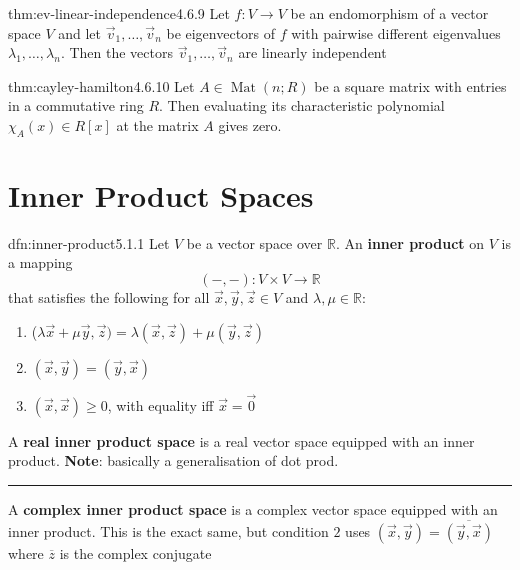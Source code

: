 \documentclass[landscape, 8pt]{extarticle}
\DeclareMathOperator{\Mat}{Mat}
\begin{document}
\begin{multicols}{3}
\vspace{-5pt}
\begin{thm}{thm:ev-linear-independence}{4.6.9}
    Let $f : V\to V$ be an endomorphism of a vector space $V$ and let $\vec{v}_{1},\dots,\vec{v}_{n}$ be eigenvectors of $f$ with pairwise different eigenvalues $\lambda_{1},\dots,\lambda_{n}$. Then the vectors $\vec{v}_{1},\dots,\vec{v}_{n}$ are linearly independent
\end{thm}

\vspace{-5pt}
\begin{thm}{thm:cayley-hamilton}{4.6.10}
    Let $A\in \Mat(n;R)$ be a square matrix with entries in a commutative ring $R$. Then evaluating its characteristic polynomial $\chi_{A}(x)\in R[x]$ at the matrix $A$ gives zero.
\end{thm}

\section{Inner Product Spaces}

\begin{dfn}{dfn:inner-product}{5.1.1}
    Let $V$ be a vector space over $\mathbb{R}$. An \textbf{inner product} on $V$ is a mapping
    \[(- , - ) : V \times V \to \mathbb{R}\]
    that satisfies the following for all $\vec{x}, \vec{y}, \vec{z}\in V$ and $\lambda,\mu\in \mathbb{R}$:
    \begin{enumerate}
        \vspace{-5pt}
        \setlength\itemsep{0em}
        \item ($\lambda\vec{x}+\mu\vec{y},\vec{z}) = \lambda(\vec{x},\vec{z}) + \mu(\vec{y},\vec{z})$
        \item $(\vec{x},\vec{y}) = (\vec{y}, \vec{x})$
        \item $(\vec{x},\vec{x}) \ge 0$, with equality iff $\vec{x} = \vec{0}$
    \end{enumerate}
    A \textbf{real inner product space} is a real vector space equipped with an inner product. \textbf{Note}: basically a generalisation of dot prod.

    \noindent\rule{\textwidth}{0.2pt}
    A \textbf{complex inner product space} is a complex vector space equipped with an inner product. This is the exact same, but condition $2$ uses $(\vec{x},\vec{y}) = \overline{(\vec{y}, \vec{x})}$ where $\overline{z}$ is the complex conjugate
\end{dfn}


\end{multicols}
\end{document}
